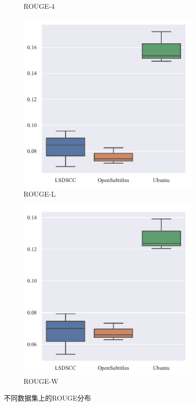 \begin{figure}[H]
\begin{subfigure}{0.3\linewidth}
        \caption{ROUGE-4}
    \end{subfigure}%
    \begin{subfigure}{0.3\linewidth}
        \centering
        \includegraphics[width=\linewidth]{figure/boxplot/dataset/rouge_l/plot.pdf}
        \caption{ROUGE-L}
    \end{subfigure}%
    \begin{subfigure}{0.3\linewidth}
        \centering
        \includegraphics[width=\linewidth]{figure/boxplot/dataset/rouge_w/plot.pdf}
        \caption{ROUGE-W}
    \end{subfigure}
    \centering
    \caption{不同数据集上的ROUGE分布}
    \label{fig:ROUGE_dataset}
\end{figure}

